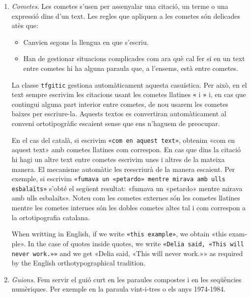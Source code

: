 \documentclass{tfgitic}[2024/07/01]
\begin{document}
\begin{enumerate}

\item \emph{Cometes}. \label{pun:cometes} Les cometes s'usen per
  assenyalar una citació, un terme o una expressió dins d’un text. Les
  regles que apliquen a les cometes són delicades atès que:
  \begin{itemize}
  \item Canvien segons la llengua en que s'escriu.
  \item Han de gestionar situacions complicades com ara què cal fer si
    en un text entre cometes hi ha alguna paraula que, a l'ensems,
    està entre cometes.
  \end{itemize}
  La classe \texttt{tfgitic} gestiona automàticament aquesta
  casuística. Per això, en el text sempre escrivim les citacions usant
  les cometes llatines \verb!«! i \verb!»! i, en cas que contingui
  alguna part interior entre cometes, de nou usarem les cometes baixes
  per escriure-la.  Aquests textos es convertiran automàticament al
  conveni ortotipogràfic escaient sense que ens n'haguem de preocupar.

  En el cas del català, si escrivim \verb!«com en aquest text»!,
  obtenim «com en aquest text» amb cometes llatines com correspon. En
  cas que dins la citació hi hagi un altre text entre cometes escrivim
  unes i altres de la mateixa manera. El mecanisme automàtic les
  reescriurà de la manera escaient. Per exemple, si escrivim
  \verb!«fumava un «petardo» mentre mirava amb ulls esbalaïts»!
  s'obté el següent resultat: «fumava un «petardo» mentre mirava amb
  ulls esbalaïts». Noteu com les cometes externes són les cometes
  llatines mentre les cometes internes són les dobles cometes altes tal
  i com correspon a la ortotipografia catalana.

  \begin{otherlanguage}{english}
    When writting in English, if we write \verb!«this example»!, we
    obtain «this example». In the case of quotes inside quotes, we
    write \verb!«Delia said, «This will never work.»»!  and we get
    «Delia said, «This will never work.»» as required by the English
    orthotypographical tradition.
  \end{otherlanguage}

\item \emph{Guions}. Fem servir el guió curt en les paraules compostes
  i en les seqüències numèriques. Per exemple en la paraula
  vint-i-tres o els anys 1974-1984.


\end{enumerate}
\end{document}
